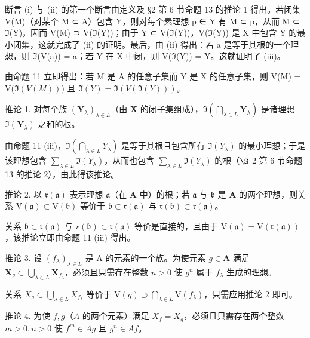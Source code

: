断言 (i) 与 (ii) 的第一个断言由定义及 §2 第 6 节命题 13 的推论 1 得出。若闭集 V(M)（对某个 M ⊂ A）包含 Y，则对每个素理想 p ∈ Y 有 M ⊂ p，从而 M ⊂ \(\mathfrak{I}\)(Y)，因而 V(M) ⊃ V(\(\mathfrak{I}\)(Y))；由于 Y ⊂ V(\(\mathfrak{I}\)(Y))，V(\(\mathfrak{I}\)(Y)) 是 X 中包含 Y 的最小闭集，这就完成了 (ii) 的证明。最后，由 (ii) 得出：若 a 是等于其根的一个理想，则 \(\mathfrak{I}\)(V(a)) = a；若 Y 在 X 中闭，则 V(\(\mathfrak{I}\)(Y)) = Y。这就证明了 (iii)。

由命题 11 立即得出：若 M 是 A 的任意子集而 Y 是 X 的任意子集，则 V(M) = V(\(\Im(V(M))\)) 且 \(\Im(Y) = \Im(V(\Im(Y)))\)。

推论 1. 对每个族 \((\mathbf{Y}_{\lambda})_{\lambda \in L}\)（由 \(\mathbf{X}\) 的闭子集组成），\(\Im\left(\bigcap_{\lambda \in L} \mathbf{Y}_{\lambda}\right)\) 是诸理想 \(\Im(\mathbf{Y}_{\lambda})\) 之和的根。

由命题 11 (iii)，\(\Im\left(\bigcap_{\lambda\in L}Y_{\lambda}\right)\) 是等于其根且包含所有 \(\Im(Y_{\lambda})\) 的最小理想；于是该理想包含 \(\sum_{\lambda\in L}\Im(Y_{\lambda})\)，从而也包含 \(\sum_{\lambda\in L}\Im(Y_{\lambda})\) 的根（\(\S\) 2 第 6 节命题 13 的推论 2），由此得该推论。

推论 2. 以 \(\mathfrak{r}(\mathfrak{a})\) 表示理想 \(\mathfrak{a}\)（在 \(\mathbf{A}\) 中）的根；若 \(\mathfrak{a}\) 与 \(\mathfrak{b}\) 是 \(\mathbf{A}\) 的两个理想，则关系 \(\mathrm{V}(\mathfrak{a}) \subset \mathrm{V}(\mathfrak{b})\) 等价于 \(\mathfrak{b} \subset \mathfrak{r}(\mathfrak{a})\) 与 \(\mathfrak{r}(\mathfrak{b}) \subset \mathfrak{r}(\mathfrak{a})\)。

关系 \(\mathfrak{b} \subset \mathfrak{r}(\mathfrak{a})\) 与 \(r(\mathfrak{b}) \subset \mathfrak{r}(\mathfrak{a})\) 等价是直接的，且由于 \(\mathrm{V}(\mathfrak{a}) = \mathrm{V}(\mathfrak{r}(\mathfrak{a}))\)，该推论立即由命题 11 (iii) 得出。

推论 3. 设 \((f_{\lambda})_{\lambda \in L}\) 是 A 的元素的一个族。为使元素 \(g \in \mathbf{A}\) 满足 \(\mathbf{X}_g \subset \bigcup_{\lambda \in L} \mathbf{X}_{f_\lambda}\)，必须且只需存在整数 \(n > 0\) 使 \(g^n\) 属于 \(f_\lambda\) 生成的理想。

关系 \(X_{g} \subset \bigcup_{\lambda \in L} X_{f_{\lambda}}\) 等价于 \(\mathrm{V}(g) \supset \bigcap_{\lambda \in L} \mathrm{V}(f_{\lambda})\)，只需应用推论 2 即可。

推论 4. 为使 \(f, g\)（\(A\) 的两个元素）满足 \(X_f = X_g\)，必须且只需存在两个整数 \(m > 0, n > 0\) 使 \(f^m \in Ag\) 且 \(g^n \in Af\)。

